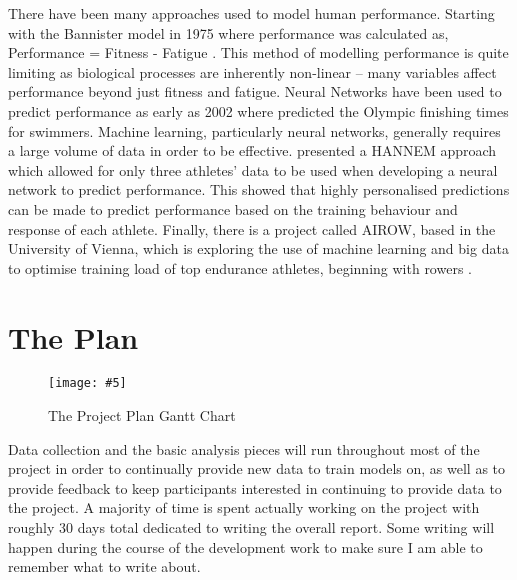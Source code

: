 \documentclass[a4paper]{article}
\newcommand{\includescalefigure}[5]{
\begin{figure}[!ht]
\centering
\texttt{[image: \#5]}
\captionsetup{width=.8\linewidth} 
\caption[#2]{#3}
\label{#1}
\end{figure}
}
\begin{document}
There have been many approaches used to model human performance. Starting with the Bannister model in 1975 where performance was calculated as, Performance = Fitness - Fatigue \autocite{Bannister1976}. This method of modelling performance is quite limiting as biological processes are inherently non-linear -- many variables affect performance beyond just fitness and fatigue. Neural Networks have been used to predict performance as early as 2002 where \textcite{Edelmannnusser2002} predicted the Olympic finishing times for swimmers. Machine learning, particularly neural networks, generally requires a large volume of data in order to be effective. \textcite{Churchill2014} presented a HANNEM approach which allowed for only three athletes' data to be used when developing a neural network to predict performance. This showed that highly personalised predictions can be made to predict performance based on the training behaviour and response of each athlete. Finally, there is a project called AIROW, based in the University of Vienna, which is exploring the use of machine learning and big data to optimise training load of top endurance athletes, beginning with rowers \autocite{AIROW}.

\section{The Plan}
{
\includescalefigure{fig:the_plan}{The Plan}{The Project Plan Gantt Chart}{0.9}{project_plan.png}
}
Data collection and the basic analysis pieces will run throughout most of the project in order to continually provide new data to train models on, as well as to provide feedback to keep participants interested in continuing to provide data to the project. A majority of time is spent actually working on the project with roughly 30 days total dedicated to writing the overall report. Some writing will happen during the course of the development work to make sure I am able to remember what to write about.
\end{document}
